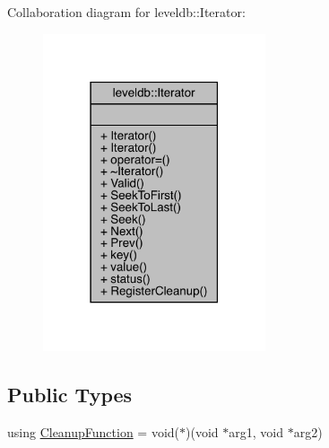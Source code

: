 Collaboration diagram for leveldb\+::Iterator\+:
\nopagebreak
\begin{figure}[H]
\begin{center}
\leavevmode
\includegraphics[width=186pt]{classleveldb_1_1_iterator__coll__graph}
\end{center}
\end{figure}
\subsection*{Public Types}
\begin{DoxyCompactItemize}
\item 
using \mbox{\hyperlink{classleveldb_1_1_iterator_aefcc7b475ddca596fe2429a2976e7730}{Cleanup\+Function}} = void($\ast$)(void $\ast$arg1, void $\ast$arg2)
\end{DoxyCompactItemize}
